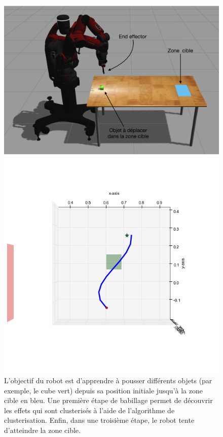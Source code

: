 \documentclass{llncs}
\begin{document}
\begin{figure}[!tbp]
  \centering
  \begin{minipage}[b]{0.4\textwidth}
    \includegraphics[width=\textwidth]{figures/Experiment_setup_annoted_FR.png}
    \caption{L'objectif du robot est d'apprendre à pousser différents objets (par exemple, le cube vert) depuis sa position initiale jusqu'à la zone cible en bleu. Une première étape de babillage permet de découvrir les effets qui sont clusterisés à l'aide de l'algorithme de clusterisation. Enfin, dans une troisième étape, le robot tente d'atteindre la zone cible.}
    \label{fig:setup}
  \end{minipage}
  \hfill
  \begin{minipage}[b]{0.4\textwidth}
    \includegraphics[width=\textwidth]{figures/ns_trajectory.png}

\end{minipage}
\end{figure}
\end{document}
